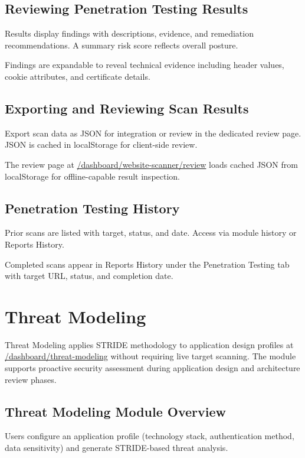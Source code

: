 \subsection{Reviewing Penetration Testing Results}

Results display findings with descriptions, evidence, and remediation recommendations. A summary risk score reflects overall posture.

Findings are expandable to reveal technical evidence including header values, cookie attributes, and certificate details.

\subsection{Exporting and Reviewing Scan Results}

Export scan data as JSON for integration or review in the dedicated review page. JSON is cached in localStorage for client-side review.

The review page at \url{/dashboard/website-scanner/review} loads cached JSON from localStorage for offline-capable result inspection.

\subsection{Penetration Testing History}

Prior scans are listed with target, status, and date. Access via module history or Reports History.

Completed scans appear in Reports History under the Penetration Testing tab with target URL, status, and completion date.

\section{Threat Modeling}

Threat Modeling applies STRIDE methodology to application design profiles at \url{/dashboard/threat-modeling} without requiring live target scanning. The module supports proactive security assessment during application design and architecture review phases.

\subsection{Threat Modeling Module Overview}

Users configure an application profile (technology stack, authentication method, data sensitivity) and generate STRIDE-based threat analysis.


